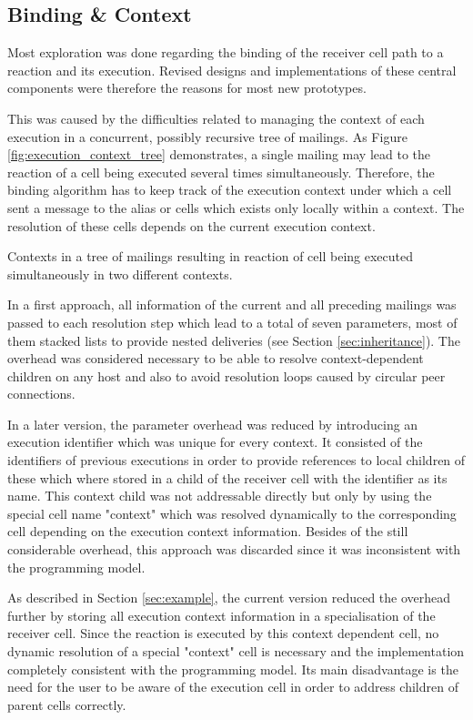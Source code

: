 \subsection{Binding \& Context}

Most exploration was done regarding the binding of the receiver cell path to a reaction and its execution. Revised designs and implementations of these central components were therefore the reasons for most new prototypes.

This was caused by the difficulties related to managing the context of each execution in a concurrent, possibly recursive tree of mailings. As Figure \ref{fig:execution_context_tree} demonstrates, a single mailing may lead to the reaction of a cell being executed several times simultaneously. Therefore, the binding algorithm has to keep track of the execution context under which a cell sent a message to the alias  or cells which exists only locally within a context. The resolution of these cells depends on the current execution context.

{Contexts in a tree of mailings resulting in reaction of cell  being executed simultaneously in two different contexts.}

In a first approach, all information of the current and all preceding mailings was passed to each resolution step which lead to a total of seven parameters, most of them stacked lists to provide nested deliveries (see Section \ref{sec:inheritance}). The overhead was considered necessary to be able to resolve context-dependent children on any host and also to avoid resolution loops caused by circular peer connections.

In a later version, the parameter overhead was reduced by introducing an execution identifier which was unique for every context. It consisted of the identifiers of previous executions in order to provide references to local children of these which where stored in a child of the receiver cell with the identifier as its name. This context child was not addressable directly but only by using the special cell name "context" which was resolved dynamically to the corresponding cell depending on the execution context information. Besides of the still considerable overhead, this approach was discarded since it was inconsistent with the programming model.

As described in Section \ref{sec:example}, the current version reduced the overhead further by storing all execution context information in a specialisation of the receiver cell. Since the reaction is executed by this context dependent cell, no dynamic resolution of a special "context" cell is necessary and the implementation completely consistent with the programming model. Its main disadvantage is the need for the user to be aware of the execution cell in order to address children of parent cells correctly.

